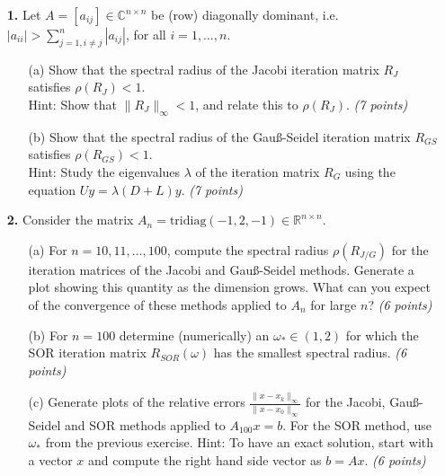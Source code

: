 \documentclass[10pt]{report}
\begin{document}
\begin{enumerate}
    
  \item[\textbf{1.}] Let $A=[a_{ij}]\in\mathbb{C}^{n\times n}$ be (row) diagonally dominant, i.e. $|a_{ii}|>\sum_{j=1,i\neq j}^n|a_{ij}|$, for all $i=1,\ldots,n$.
  \begin{enumerate}
    \item[(a)] Show that the spectral radius of the Jacobi iteration matrix $R_J$ satisfies  $\rho(R_J) <1$.\\
    Hint: Show that $\|R_J\|_{\infty}<1$, and relate this to $\rho(R_J)$. \textit{(7 points)}

    \item[(b)] Show that the spectral radius of the Gau\ss-Seidel iteration matrix $R_{GS}$ satisfies $\rho(R_{GS}) <1$.\\
Hint: Study the eigenvalues $\lambda$ of the iteration matrix
      $R_G$ using the equation $Uy=\lambda(D+L)y$. \linebreak 
\textit{(7 points)}
\end{enumerate}

\vspace{0.1cm} 

\item[\textbf{2.}] Consider the matrix $A_n=\text{tridiag}(-1,2,-1)\in\mathbb{R}^{n\times n}$.
  \begin{enumerate}
    \item[(a)] For  $n=10,11,\ldots,100$, compute the spectral radius $\rho(R_{J/G})$ for the iteration matrices of the Jacobi and Gau\ss-Seidel methods. Generate a plot showing this quantity as the dimension grows. What can you expect of the convergence  of these methods applied to $A_n$ for large $n$? \textit{(6 points)}

    \item[(b)] For $n=100$ determine (numerically) an $\omega_*\in(1,2)$ for which the SOR iteration matrix $R_{SOR}(\omega)$ has the smallest spectral radius. \textit{(6 points)}


    \item[(c)] Generate plots of the relative errors $\frac{\|x-x_k\|_{\infty}}{\|x-x_0\|_{\infty}}$ for the Jacobi, Gau\ss-Seidel and SOR methods applied to $A_{100}x=b$. For the SOR method, use $\omega_*$ from the previous exercise. Hint: To have an exact solution, start with a vector $x$ and compute the right hand side vector as $b=Ax$.  \textit{(6 points)} 
\end{enumerate}
\vspace{0.1cm} 



\end{enumerate}
\end{document}

